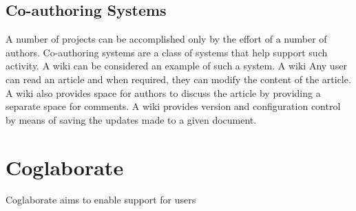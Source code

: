 
\subsection{Co-authoring Systems}

A number of projects can be accomplished only by the effort of a
number of authors. Co-authoring systems are a class of systems that
help support such activity. A wiki can be considered an example of
such a system. A wiki Any user can read an article and when required, they
can modify the content of the article. A wiki also provides space for
authors to discuss the article by providing a separate space for
comments. A wiki provides version and configuration control by means
of saving the updates made to a given document.

\section{Coglaborate}


Coglaborate aims to enable support for users 






 


